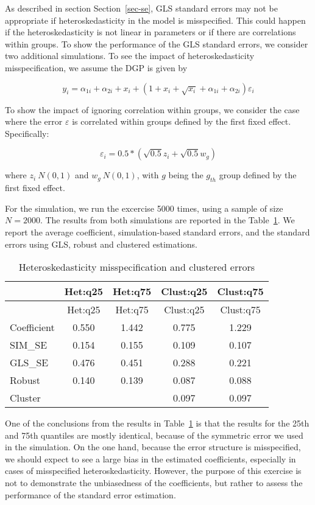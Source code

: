 \documentclass[
  authoryear,
  review,
  1p]{elsarticle}
\begin{document}
As described in section Section~\ref{sec-se}, GLS standard errors may
not be appropriate if heteroskedasticity in the model is misspecified.
This could happen if the heteroskedasticity is not linear in parameters
or if there are correlations within groups. To show the performance of
the GLS standard errors, we consider two additional simulations. To see
the impact of heteroskedasticity misspecification, we assume the DGP is
given by

\[y_i = \alpha_{1i} + \alpha_{2i} + x_i + (1+x_i + \sqrt{x_i} +\alpha_{1i} + \alpha_{2i} ) \varepsilon_i
\]

To show the impact of ignoring correlation within groups, we consider
the case where the error \(\varepsilon\) is correlated within groups
defined by the first fixed effect. Specifically:

\[\varepsilon_i =0.5*(\sqrt{0.5} z_i + \sqrt{0.5} w_g)\]

where \(z_i~N(0,1)\) and \(w_g~N(0,1)\), with \(g\) being the \(g_{th}\)
group defined by the first fixed effect.

For the simulation, we run the excercise 5000 times, using a sample of
size \(N=2000\). The results from both simulations are reported in the
Table~\ref{tbl-sim2}. We report the average coefficient,
simulation-based standard errors, and the standard errors using GLS,
robust and clustered estimations.

\hypertarget{tbl-sim2}{}
\begin{longtable}[]{@{}lcccc@{}}
\caption{\label{tbl-sim2}Heteroskedasticity misspecification and
clustered errors}\tabularnewline
\toprule\noalign{}
& Het:q25 & Het:q75 & Clust:q25 & Clust:q75 \\
\midrule\noalign{}
\endfirsthead
\toprule\noalign{}
& Het:q25 & Het:q75 & Clust:q25 & Clust:q75 \\
\midrule\noalign{}
\endhead
\bottomrule\noalign{}
\endlastfoot
Coefficient & 0.550 & 1.442 & 0.775 & 1.229 \\
SIM\_SE & 0.154 & 0.155 & 0.109 & 0.107 \\
GLS\_SE & 0.476 & 0.451 & 0.288 & 0.221 \\
Robust & 0.140 & 0.139 & 0.087 & 0.088 \\
Cluster & & & 0.097 & 0.097 \\
\end{longtable}

One of the conclusions from the results in Table~\ref{tbl-sim2} is that
the results for the 25th and 75th quantiles are mostly identical,
because of the symmetric error we used in the simulation. On the one
hand, because the error structure is misspecified, we should expect to
see a large bias in the estimated coefficients, especially in cases of
misspecified heteroskedasticity. However, the purpose of this exercise
is not to demonstrate the unbiasedness of the coefficients, but rather
to assess the performance of the standard error estimation.
\end{document}

